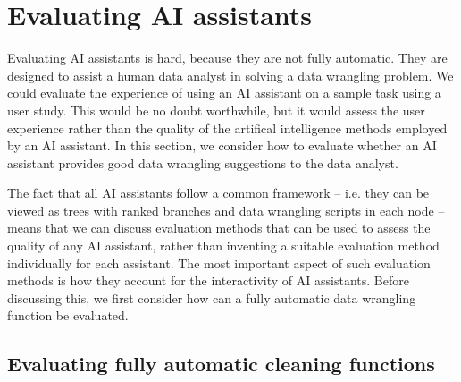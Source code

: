 \documentclass{article}
\begin{document}
\section{Evaluating AI assistants}
\label{sec:evaluation}


Evaluating AI assistants is hard, because they are not fully automatic. They are designed to 
assist a human data analyst in solving a data wrangling problem. We could evaluate the experience 
of using an AI assistant on a sample task using a user study. This would be no doubt worthwhile, 
but it would assess the user experience rather than the quality of the artifical intelligence 
methods employed by an AI assistant. In this section, we consider how to evaluate whether an 
AI assistant provides good data wrangling suggestions to the data analyst. 

The fact that all AI assistants follow a common framework -- i.e. they can be viewed as trees with
ranked branches and data wrangling scripts in each node -- means that we can discuss evaluation 
methods that can be used to assess the quality of any AI assistant, rather than inventing a 
suitable evaluation method individually for each assistant. The most important aspect of such
evaluation methods is how they account for the interactivity of AI assistants. Before discussing
this, we first consider how can a fully automatic data wrangling function be evaluated.

\subsection{Evaluating fully automatic cleaning functions}
\label{sec:eval-auto}
\end{document}
